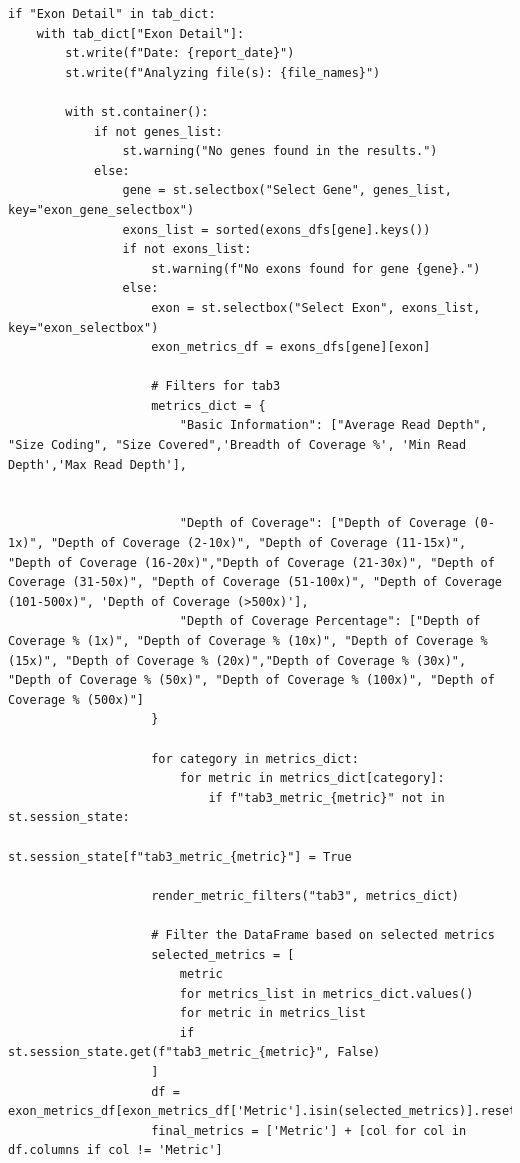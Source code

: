 \begin{longlisting}
\begin{verbatim}
if "Exon Detail" in tab_dict:
    with tab_dict["Exon Detail"]:
        st.write(f"Date: {report_date}")
        st.write(f"Analyzing file(s): {file_names}")
        
        with st.container():
            if not genes_list:
                st.warning("No genes found in the results.")
            else:
                gene = st.selectbox("Select Gene", genes_list, key="exon_gene_selectbox")
                exons_list = sorted(exons_dfs[gene].keys())
                if not exons_list:
                    st.warning(f"No exons found for gene {gene}.")
                else:
                    exon = st.selectbox("Select Exon", exons_list, key="exon_selectbox")
                    exon_metrics_df = exons_dfs[gene][exon]

                    # Filters for tab3
                    metrics_dict = {
                        "Basic Information": ["Average Read Depth", "Size Coding", "Size Covered",'Breadth of Coverage %', 'Min Read Depth','Max Read Depth'],

                        
                        "Depth of Coverage": ["Depth of Coverage (0-1x)", "Depth of Coverage (2-10x)", "Depth of Coverage (11-15x)", "Depth of Coverage (16-20x)","Depth of Coverage (21-30x)", "Depth of Coverage (31-50x)", "Depth of Coverage (51-100x)", "Depth of Coverage (101-500x)", 'Depth of Coverage (>500x)'],
                        "Depth of Coverage Percentage": ["Depth of Coverage % (1x)", "Depth of Coverage % (10x)", "Depth of Coverage % (15x)", "Depth of Coverage % (20x)","Depth of Coverage % (30x)", "Depth of Coverage % (50x)", "Depth of Coverage % (100x)", "Depth of Coverage % (500x)"]
                    }

                    for category in metrics_dict:
                        for metric in metrics_dict[category]:
                            if f"tab3_metric_{metric}" not in st.session_state:
                                st.session_state[f"tab3_metric_{metric}"] = True

                    render_metric_filters("tab3", metrics_dict)

                    # Filter the DataFrame based on selected metrics
                    selected_metrics = [
                        metric
                        for metrics_list in metrics_dict.values()
                        for metric in metrics_list
                        if st.session_state.get(f"tab3_metric_{metric}", False)
                    ]
                    df = exon_metrics_df[exon_metrics_df['Metric'].isin(selected_metrics)].reset_index(drop=True)
                    final_metrics = ['Metric'] + [col for col in df.columns if col != 'Metric']


\end{verbatim}
\end{longlisting}
